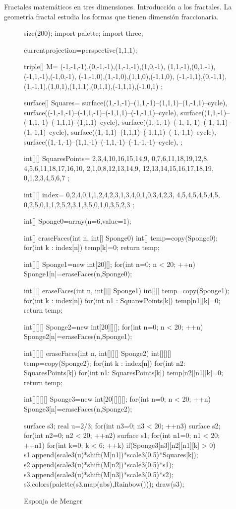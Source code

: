 Fractales matemáticos en tres dimensiones. Introducción a los fractales. La geometría fractal estudia las formas que tienen dimensión fraccionaria.


\begin{figure}[!ht]
	\centering
	\begin{asy}
	size(200);
	import palette;
	import three;

	currentprojection=perspective(1,1,1);

	triple[] M=
	{
	(-1,-1,-1),(0,-1,-1),(1,-1,-1),(1,0,-1),
	(1,1,-1),(0,1,-1),(-1,1,-1),(-1,0,-1),
	(-1,-1,0),(1,-1,0),(1,1,0),(-1,1,0),
	(-1,-1,1),(0,-1,1),(1,-1,1),(1,0,1),(1,1,1),(0,1,1),(-1,1,1),(-1,0,1)
	};

	surface[] Squares=
	{
	surface((1,-1,-1)--(1,1,-1)--(1,1,1)--(1,-1,1)--cycle),
	surface((-1,-1,-1)--(-1,1,-1)--(-1,1,1)--(-1,-1,1)--cycle),
	surface((1,1,-1)--(-1,1,-1)--(-1,1,1)--(1,1,1)--cycle),
	surface((1,-1,-1)--(-1,-1,-1)--(-1,-1,1)--(1,-1,1)--cycle),
	surface((1,-1,1)--(1,1,1)--(-1,1,1)--(-1,-1,1)--cycle),
	surface((1,-1,-1)--(1,1,-1)--(-1,1,-1)--(-1,-1,-1)--cycle),
	};

	int[][] SquaresPoints=
	{
	{2,3,4,10,16,15,14,9},
	{0,7,6,11,18,19,12,8},
	{4,5,6,11,18,17,16,10},
	{2,1,0,8,12,13,14,9},
	{12,13,14,15,16,17,18,19},
	{0,1,2,3,4,5,6,7}
	};

	int[][] index=
	{
	{0,2,4},{0,1},{1,2,4},{2,3},{1,3,4},{0,1},{0,3,4},{2,3},
	{4,5},{4,5},{4,5},{4,5},
	{0,2,5},{0,1},{1,2,5},{2,3},{1,3,5},{0,1},{0,3,5},{2,3}
	};

	int[] Sponge0=array(n=6,value=1);

	int[] eraseFaces(int n, int[] Sponge0) {
	int[] temp=copy(Sponge0);
	for(int k : index[n]) {
	temp[k]=0;
	}
	return temp;
	}

	int[][] Sponge1=new int[20][];
	for(int n=0; n < 20; ++n) {
	Sponge1[n]=eraseFaces(n,Sponge0);
	}

	int[][] eraseFaces(int n, int[][] Sponge1) {
	int[][] temp=copy(Sponge1);
	for(int k : index[n])
	for(int n1 : SquaresPoints[k])
	temp[n1][k]=0;
	return temp;
	}

	int[][][] Sponge2=new int[20][][];
	for(int n=0; n < 20; ++n)
	Sponge2[n]=eraseFaces(n,Sponge1);

	int[][][] eraseFaces(int n, int[][][] Sponge2) {
	int[][][] temp=copy(Sponge2);
	for(int k : index[n])
	for(int n2: SquaresPoints[k])
	for(int n1: SquaresPoints[k])
	temp[n2][n1][k]=0;
	return temp;
	}

	int[][][][] Sponge3=new int[20][][][];
	for(int n=0; n < 20; ++n)
	Sponge3[n]=eraseFaces(n,Sponge2);

	surface s3;
	real u=2/3;
	for(int n3=0; n3 < 20; ++n3) {
	surface s2;
	for(int n2=0; n2 < 20; ++n2) {
	surface s1;
	for(int n1=0; n1 < 20; ++n1) {
	for(int k=0; k < 6; ++k) {
	if(Sponge3[n3][n2][n1][k] > 0) {
	s1.append(scale3(u)*shift(M[n1])*scale3(0.5)*Squares[k]);
	}
	}
	}
	s2.append(scale3(u)*shift(M[n2])*scale3(0.5)*s1);
	}
	s3.append(scale3(u)*shift(M[n3])*scale3(0.5)*s2);
	}
	s3.colors(palette(s3.map(abs),Rainbow()));
	draw(s3);
	\end{asy}

	\caption{Esponja de Menger}
\end{figure}


